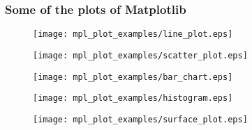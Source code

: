 \begin{frame}
  \frametitle{Some of the plots of Matplotlib}
  \begin{figure}
    \centering
    \begin{minipage}{.25\textwidth}
      \centering
      \texttt{[image: mpl\_plot\_examples/line\_plot.eps]} %
    \end{minipage}%
    \begin{minipage}{.25\textwidth}
      \centering
      \texttt{[image: mpl\_plot\_examples/scatter\_plot.eps]} %
    \end{minipage}
  \end{figure}

  \begin{figure}
    \centering
    \begin{minipage}{.25\textwidth}
      \centering
      \texttt{[image: mpl\_plot\_examples/bar\_chart.eps]} %
    \end{minipage}%
    \begin{minipage}{.25\textwidth}
      \centering
      \texttt{[image: mpl\_plot\_examples/histogram.eps]} %
    \end{minipage}
    \begin{minipage}{.25\textwidth}
      \centering
      \texttt{[image: mpl\_plot\_examples/surface\_plot.eps]} %
    \end{minipage}
  \end{figure}
\end{frame}



